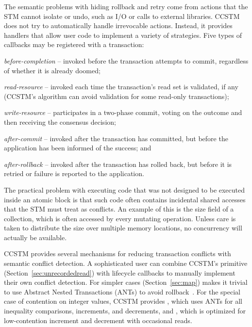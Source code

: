 The semantic problems with hiding rollback and retry come
from actions that the STM cannot isolate or undo, such as I/O or calls to
external libraries.
CCSTM does not try to automatically handle irrevocable actions.  Instead,
it provides handlers that allow user code to implement a variety of
strategies.  Five types of callbacks may be registered with a transaction:
\begin{packed_itemize}

\item{\it before-completion} -- invoked before the transaction attempts to
commit, regardless of whether it is already doomed;

\item{\it read-resource} -- invoked each time the transaction's read
set is validated, if any (CCSTM's algorithm can avoid validation for
some read-only transactions);

\item{\it write-resource} -- participates in a two-phase commit, voting on the
outcome and then receiving the consensus decision;

\item{\it after-commit} -- invoked after the transaction has committed, but
before the application has been informed of the success; and

\item{\it after-rollback} -- invoked after the transaction has rolled back, but
before it is retried or failure is reported to the application.

\end{packed_itemize}

The practical problem with executing code that was not designed to
be executed inside an atomic block is that such code often contains
incidental shared accesses that the STM must treat as conflicts.
An example of this is the size field of a collection, which is often
accessed by every mutating operation.  Unless care is taken to distribute
the size over multiple memory locations, no concurrency will actually
be available.

CCSTM provides several mechanisms for reducing transaction conflicts with
semantic conflict detection.  A sophisticated user can combine CCSTM's
 primitive (Section~\ref{sec:unrecordedread}) with
lifecycle callbacks to manually implement their own conflict detection.
For simpler cases  (Section~\ref{sec:map})
makes it trivial to use Abstract Nested Transactions (ANTs) to avoid
rollback~\cite{harris07abstract}.  For the special case of contention
on integer values, CCSTM provides , which
uses ANTs for all inequality comparisons, increments, and decrements, and
, which is optimized for low-contention increment
and decrement with occasional reads.
